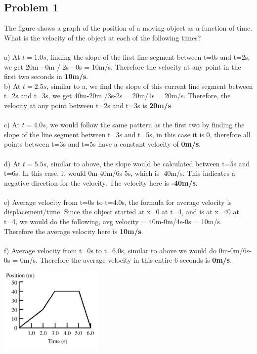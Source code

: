 \documentclass{article}
\begin{document}
\subsection{Problem 1} 
The figure shows a graph of the position of a moving object as a function of time. What is the velocity of the object at each of the following times? \\ \\
a) At \(t=1.0s\), finding the slope of the first line segment between t=0s and t=2s, we get 20m - 0m / 2s - 0s = 10m/s. Therefore the velocity at any point in the first two seconds in \textbf{10m/s}. \\ 
b) At \(t=2.5s\), similar to a, we find the slope of this current line segment between t=2s and t=3s, we get 40m-20m /3s-2s = 20m/1s = 20m/s. Therefore, the velocity at any point between t=2s and t=3s is \textbf{20m/s} \\ \\
c) At \(t=4.0s\), we would follow the same pattern as the first two by finding the slope of the line segment between t=3s and t=5s, in this case it is 0, therefore all points between t=3s and t=5s have a constant velocity of \textbf{0m/s}. \\ \\ 
d) At \(t=5.5s\), similar to above, the slope would be calculated between t=5s and t=6s. In this case, it would 0m-40m/6s-5s, which is -40m/s. This indicates a negative direction for the velocity. The velocity here is \textbf{-40m/s}.\\ \\ 
e) Average velocity from t=0s to t=4.0s, the formula for average velocity is displacement/time. Since the object started at x=0 at t=4, and is at x=40 at t=4, we would do the following, avg velocity = 40m-0m/4s-0s = 10m/s. Therefore the average velocity here is \textbf{10m/s}. \\ \\ 
f) Average velocity from t=0s to t=6.0s, similar to above we would do 0m-0m/6s-0s = 0m/s. Therefore the average velocity in this entire 6 seconds is \textbf{0m/s}. 
\begin{center} 
\includegraphics[scale=0.6]{postlab1.jpg}
\end{center}
\end{document}

